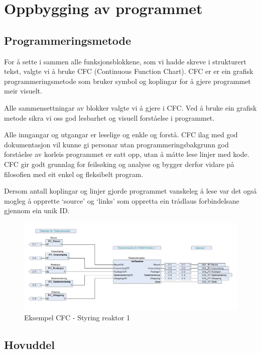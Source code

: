 \newpage
\section{Oppbygging av programmet}
\thispagestyle{fancy}

\subsection{Programmeringsmetode}
For å sette i sammen alle funksjonsblokkene, som vi hadde skreve i strukturert tekst, valgte vi å bruke  CFC (Continuous Function Chart).
CFC er er ein grafisk programmeringsmetode som bruker symbol og koplingar for å gjere programmet  meir visuelt.

Alle sammensettningar av blokker valgte vi å gjere i CFC. Ved å bruke ein grafisk metode sikra vi oss god lesbarhet og
visuell forståelse i programmet. 

Alle inngangar og utgangar er leselige og enkle og forstå. CFC ilag med god dokumentasjon vil kunne gi personar utan programmeringsbakgrunn
god forståelse av korleis programmet er satt opp, utan å måtte lese linjer med kode.
CFC gir godt grunnlag for feilsøking og analyse og bygger derfor vidare på filosofien med eit enkel og fleksibelt program.

Dersom antall koplingar og linjer gjorde programmet vanskeleg å lese var det også
mogleg å opprette `source' og `links' som oppretta ein trådlaus forbindelsane gjennom ein unik ID.


\begin{figure}[htbp]
    \centering
    \includegraphics[width=1\textwidth]{Bilder/ReaktorPRG.png}
    \caption{Eksempel CFC - Styring reaktor 1}\label{fig:reaktorsoner}
\end{figure}

\newpage

\subsection{Hovuddel}

